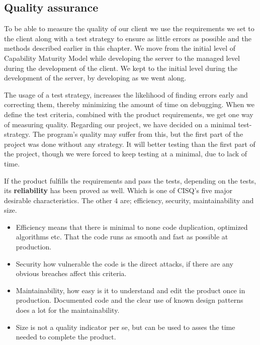 \subsection{Quality assurance}
To be able to measure the quality of our client we use the requirements we set to the client along with a test strategy to ensure as little errors as possible and the methods described earlier in this chapter. We move from the initial level of Capability Maturity Model while developing the server to the managed level during the development of the client. We kept to the initial level during the development of the server, by developing as we went along.

The usage of a test strategy, increases the likelihood of finding errors early and correcting them, thereby minimizing the amount of time on debugging. When we define the test criteria, combined with the product requirements, we get one way of measuring quality.
Regarding our project, we have decided on a minimal test-strategy. The program's quality may suffer from this, but the first part of the project was done without any strategy. It will better testing than the first part of the project, though we were forced to keep testing at a minimal, due to lack of time.

 If the product fulfills the requirements and pass the tests, depending on the tests, its \textbf{reliability} has been proved as well. Which is one of CISQ's five major desirable characteristics. The other 4 are; efficiency, security, maintainability and size.
 \begin{itemize}
 	\item Efficiency means that there is minimal to none code duplication, optimized algorithms etc. That the code runs as smooth and fast as possible at production.
 	\item Security how vulnerable the code is the direct attacks, if there are any obvious breaches affect this criteria.
 	\item Maintainability, how easy is it to understand and edit the product once in production. Documented code and the clear use of known design patterns does a lot for the maintainability. 
 	 \item Size is not a quality indicator per se, but can be used to asses the time needed to complete the product.  
 \end{itemize} 
 
